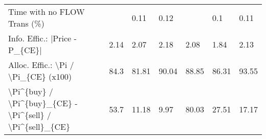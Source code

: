 \begin{tabular}{lllllll}
 Time with no FLOW Trans (\%)                               &          & 0.11     & 0.12     &           & 0.1       & 0.11      \\
 Info. Effic.: |Price - P\_\{CE\}|                            & 2.14     & 2.07     & 2.18     & 2.08      & 1.84      & 2.13      \\
 Alloc. Effic.: \textbackslash{}Pi / \textbackslash{}Pi\_\{CE\} (x100)                      & 84.3     & 81.81    & 90.04    & 88.85     & 86.31     & 93.55     \\
 \textbackslash{}Pi\^{}\{buy\} / \textbackslash{}Pi\^{}\{buy\}\_\{CE\} - \textbackslash{}Pi\^{}\{sell\} / \textbackslash{}Pi\^{}\{sell\}\_\{CE\} & 53.7     & 11.18    & 9.97     & 80.03     & 27.51     & 17.17     \\
\hline
\end{tabular}